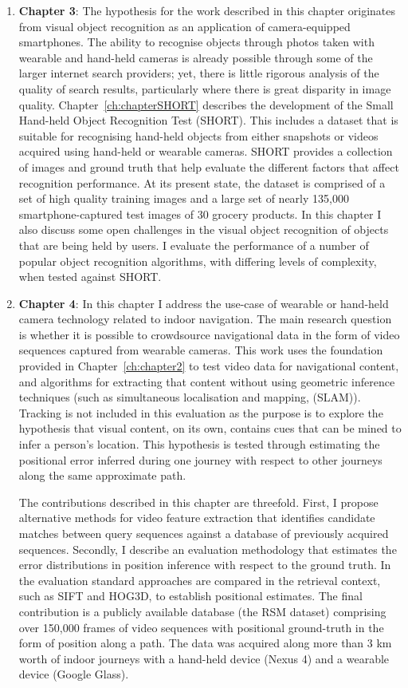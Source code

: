 \begin{enumerate}
\item \textbf{Chapter 3}: The hypothesis for the work described in this chapter originates from visual object recognition as an application of camera-equipped smartphones. The ability to recognise objects through photos taken with wearable and hand-held cameras is already possible through some of the larger internet search providers; yet, there is little rigorous analysis of the quality of search results, particularly where there is great disparity in image quality. Chapter~\ref{ch:chapterSHORT} describes the development of the Small Hand-held Object Recognition Test (SHORT). This includes a dataset that is suitable for recognising hand-held objects from either snapshots or videos acquired using hand-held or wearable cameras. SHORT provides a collection of images and ground truth that help evaluate the different factors that affect recognition performance. At its present state, the dataset is comprised of a set of high quality training images and a large set of nearly 135,000 smartphone-captured test images of 30 grocery products. In this chapter I also discuss some open challenges in the visual object recognition of objects that are being held by users. I evaluate the performance of a number of popular object recognition algorithms, with differing levels of complexity, when tested against SHORT.


\item \textbf{Chapter 4}: In this chapter I address the use-case of wearable or hand-held camera technology related to indoor navigation. The main research question is whether it is possible to crowdsource navigational data in the form of video sequences captured from wearable cameras.  This work uses the foundation provided in Chapter~\ref{ch:chapter2} to test video data for navigational content, and algorithms for extracting that content without using geometric inference techniques (such as simultaneous localisation and mapping, (SLAM)).  Tracking is not included in this evaluation as the purpose is to explore the hypothesis that visual content, on its own, contains cues that can be mined to infer a person's location.  This hypothesis is tested through estimating the positional error inferred during one journey with respect to other journeys along the same approximate path.

The contributions described in this chapter are threefold. First, I propose alternative methods for video feature extraction that identifies candidate matches between query sequences against a database of previously acquired sequences. Secondly, I describe an evaluation methodology that estimates the error distributions in position inference with respect to the ground truth. In the evaluation standard approaches are compared in the retrieval context, such as SIFT and HOG3D, to establish positional estimates. The final contribution is a publicly available database (the RSM dataset) comprising over 150,000 frames of video sequences with positional ground-truth in the form of position along a path. The data was acquired along more than 3 km worth of indoor journeys with a hand-held device (Nexus 4) and a wearable device (Google Glass).


\end{enumerate}
